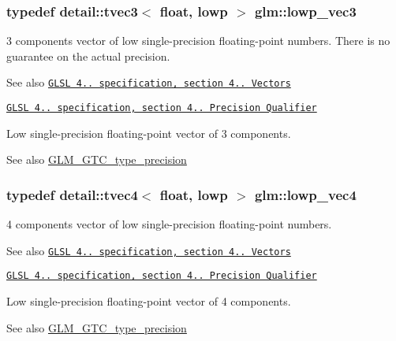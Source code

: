 \subsubsection[{\texorpdfstring{lowp\+\_\+vec3}{lowp_vec3}}]{\setlength{\rightskip}{0pt plus 5cm}typedef detail\+::tvec3$<$ float, lowp $>$ {\bf glm\+::lowp\+\_\+vec3}}\hypertarget{group__core__precision_ga062795097526e2758d34cb38387dd82d}{}\label{group__core__precision_ga062795097526e2758d34cb38387dd82d}
3 components vector of low single-\/precision floating-\/point numbers. There is no guarantee on the actual precision.

\begin{DoxySeeAlso}{See also}
\href{http://www.opengl.org/registry/doc/GLSLangSpec.4.20.8.pdf}{\tt G\+L\+SL 4.. specification, section 4.. Vectors} 

\href{http://www.opengl.org/registry/doc/GLSLangSpec.4.20.8.pdf}{\tt G\+L\+SL 4.. specification, section 4.. Precision Qualifier}
\end{DoxySeeAlso}
Low single-\/precision floating-\/point vector of 3 components. \begin{DoxySeeAlso}{See also}
\hyperlink{group__gtc__type__precision}{G\+L\+M\+\_\+\+G\+T\+C\+\_\+type\+\_\+precision} 
\end{DoxySeeAlso}
\subsubsection[{\texorpdfstring{lowp\+\_\+vec4}{lowp_vec4}}]{\setlength{\rightskip}{0pt plus 5cm}typedef detail\+::tvec4$<$ float, lowp $>$ {\bf glm\+::lowp\+\_\+vec4}}\hypertarget{group__core__precision_ga706ad1296c1cdcbd26c815fbb0f3f846}{}\label{group__core__precision_ga706ad1296c1cdcbd26c815fbb0f3f846}
4 components vector of low single-\/precision floating-\/point numbers.

\begin{DoxySeeAlso}{See also}
\href{http://www.opengl.org/registry/doc/GLSLangSpec.4.20.8.pdf}{\tt G\+L\+SL 4.. specification, section 4.. Vectors} 

\href{http://www.opengl.org/registry/doc/GLSLangSpec.4.20.8.pdf}{\tt G\+L\+SL 4.. specification, section 4.. Precision Qualifier}
\end{DoxySeeAlso}
Low single-\/precision floating-\/point vector of 4 components. \begin{DoxySeeAlso}{See also}
\hyperlink{group__gtc__type__precision}{G\+L\+M\+\_\+\+G\+T\+C\+\_\+type\+\_\+precision} 
\end{DoxySeeAlso}
